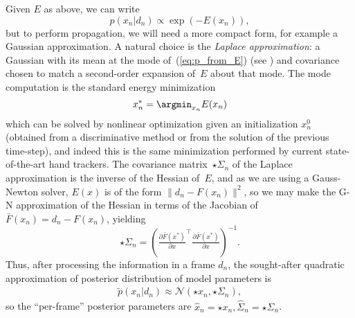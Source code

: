 Given $E$ as above, we can write
\begin{equation}
p(x_n|d_n) \propto \exp(-E(x_n)), 
\label{eq:p_from_E}
\end{equation}
but to perform propagation, we will need a more compact form, for example a Gaussian approximation.   A natural choice is the \emph{Laplace approximation}: a Gaussian with its mean at the mode of~(\ref{eq:p_from_E}) (see ) and covariance chosen to match a second-order expansion of~$E$ about that mode. 
The mode computation is the standard energy minimization
\begin{equation}
\star x_n = \argmin_{x_n} E(x_n)
\label{eq:xmin}
\end{equation}
which can be solved by nonlinear optimization given an initialization $x_n^0$ (obtained from a discriminative method or from the solution of the previous time-step), and indeed this is the same minimization performed by current state-of-the-art hand trackers.
The covariance matrix~$\star\Sigma_n$ of the Laplace approximation is the inverse of the Hessian of~$E$, and as we are using a Gauss-Newton solver, $E(x)$ is of the form $\|d_n - F(x_n)\|^2$, so we may make the G-N approximation of the Hessian in terms of the Jacobian of~
$\bar{F}(x_n) = d_n - F(x_n)$, yielding
\begin{equation}
{\star{\Sigma}_n} = \left(\tfrac{\partial \bar{F}(x^*)}{\partial x}^\top \tfrac{\partial \bar{F}(x^*)}{\partial x}\right)^{-1}.
\end{equation}
Thus, after processing the information in a frame $d_n$, the sought-after quadratic approximation of posterior distribution of model parameters is 
\begin{align}
\tilde{p}(x_n|d_n) \approx \mathcal{N}\left(\star{x}_n, \star{\Sigma}_n \right),
\end{align}
so the ``per-frame'' posterior parameters are $\hat x_n = \star x_n, \hat\Sigma_n = \star\Sigma_n$.


